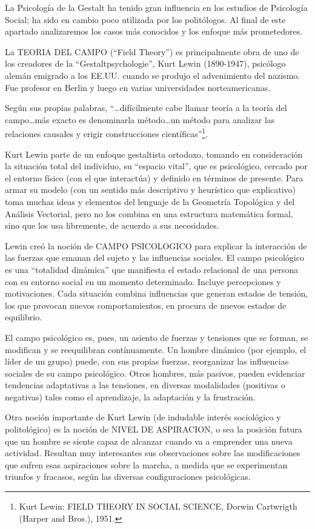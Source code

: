 \documentclass[
]{book}
\begin{document}
La Psicología de la Gestalt ha tenido gran influencia en los estudios de Psicología Social; ha sido en cambio poco utilizada por los politólogos. Al final de este apartado analizaremos los casos más conocidos y los enfoque más prometedores.

La TEORIA DEL CAMPO (``Field Theory'') es principalmente obra de uno de los creadores de la ``Gestaltpsychologie'', Kurt Lewin (1890-1947), psicólogo alemán emigrado a los EE.UU. cuando se produjo el advenimiento del nazismo. Fue profesor en Berlin y luego en varias universidades norteamericanas.

Según sus propias palabras, ``\ldots difícilmente cabe llamar teoría a la teoría del campo\ldots más exacto es denominarla método\ldots un método para analizar las relaciones causales y erigir construcciones científicas''\footnote{Kurt Lewin: FIELD THEORY IN SOCIAL SCIENCE, Dorwin Cartwrigth (Harper and Bros.), 1951.}.

Kurt Lewin parte de un enfoque gestaltista ortodoxo, tomando en consideración la situación total del individuo, su ``espacio vital'', que es psicológico, cercado por el entorno físico (con el que interactúa) y definido en términos de presente. Para armar su modelo (con un sentido más descriptivo y heurístico que explicativo) toma muchas ideas y elementos del lenguaje de la Geometría Topológica y del Análisis Vectorial, pero no los combina en una estructura matemática formal, sino que los usa libremente, de acuerdo a sus necesidades.

Lewin creó la noción de CAMPO PSICOLOGICO para explicar la interacción de las fuerzas que emanan del sujeto y las influencias sociales. El campo psicológico es una ``totalidad dinámica'' que manifiesta el estado relacional de una persona con su entorno social en un momento determinado. Incluye percepciones y motivaciones. Cada situación combina influencias que generan estados de tensión, los que provocan nuevos comportamientos, en procura de nuevos estados de equilibrio.

El campo psicológico es, pues, un asiento de fuerzas y tensiones que se forman, se modifican y se reequilibran contínuamente. Un hombre dinámico (por ejemplo, el líder de un grupo) puede, con sus propias fuerzas, reorganizar las influencias sociales de su campo psicológico. Otros hombres, más pasivos, pueden evidenciar tendencias adaptativas a las tensiones, en diversas modalidades (positivas o negativas) tales como el aprendizaje, la adaptación y la frustración.

Otra noción importante de Kurt Lewin (de indudable interés sociológico y politológico) es la noción de NIVEL DE ASPIRACION, o sea la posición futura que un hombre se siente capaz de alcanzar cuando va a emprender una nueva actividad. Resultan muy interesantes sus observaciones sobre las modificaciones que sufren esas aspiraciones sobre la marcha, a medida que se experimentan triunfos y fracasos, según las diversas configuraciones psicológicas.
\end{document}
